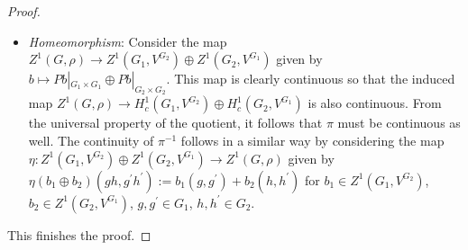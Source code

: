 \documentclass[10pt,a4paper]{amsart}
\begin{document}
\begin{proof}
\begin{itemize}
\begin{eqnarray*}
 & = & \left(b_{1}(g^{\prime},g^{\prime\prime})-b_{1}(g,g^{\prime\prime})+b_{1}(g,g^{\prime})\right)\\
 &  & +\left(b_{2}(h^{\prime},h^{\prime\prime})-b_{2}(h,h^{\prime\prime})+b_{2}(h,h^{\prime})\right)\\
 & = & 0,
\end{eqnarray*}
so that $b\in Z^{1}(G,\rho)$ with $[Pb|_{G_{1}\times G_{1}}]=[b_{1}]$, $[Pb|_{G_{2}\times G_{2}}]=[b_{2}]$. We obtain that $\pi$ is surjective. 
\item \emph{Homeomorphism}: Consider the map $Z^{1}(G,\rho)\rightarrow Z^{1}(G_{1},V^{G_{2}})\oplus Z^{1}(G_{2},V^{G_{1}})$ given by $b\mapsto Pb|_{G_{1}\times G_{1}} \oplus Pb|_{G_{2}\times G_{2}}$. This map is clearly continuous so that the induced map $Z^{1}(G,\rho)\rightarrow H_{c}^{1}(G_{1},V^{G_{2}})\oplus H_{c}^{1}(G_{2},V^{G_{1}})$ is also continuous. From the universal property of the quotient, it follows that $\pi$ must be continuous as well. The continuity of $\pi^{-1}$ follows in a similar way by considering the map $\eta:Z^{1}(G_{1},V^{G_{2}})\oplus Z^{1}(G_{2},V^{G_{1}})\rightarrow Z^{1}(G,\rho)$ given by $\eta(b_{1}\oplus b_{2})(gh,g^{\prime}h^{\prime}):=b_{1}(g,g^{\prime})+b_{2}(h,h^{\prime})$ for $b_{1}\in Z^{1}(G_{1},V^{G_{2}})$, $b_{2}\in Z^{1}(G_{2},V^{G_{1}})$, $g,g^{\prime}\in G_{1}$, $h,h^{\prime}\in G_{2}$. 
\end{itemize}
This finishes the proof. \end{proof}
\end{document}
